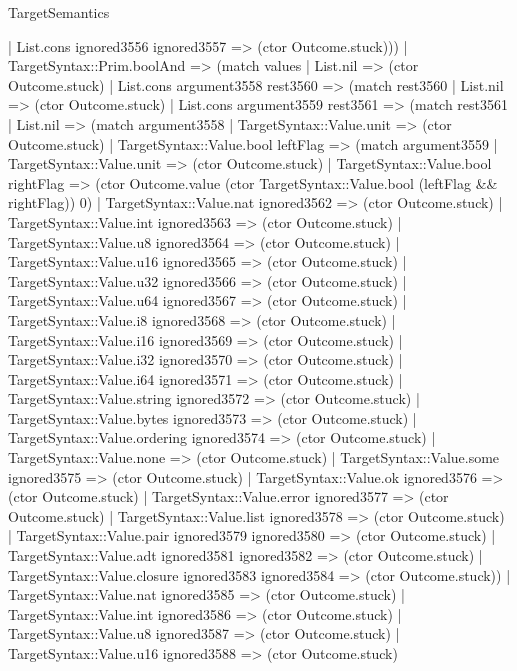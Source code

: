 \begin{lexlean}{TargetSemantics}
\begin{semanticmodule}
{        | List.cons ignored3556 ignored3557 => (ctor Outcome.stuck)))
    | TargetSyntax::Prim.boolAnd => (match values
      | List.nil => (ctor Outcome.stuck)
      | List.cons argument3558 rest3560 => (match rest3560
        | List.nil => (ctor Outcome.stuck)
        | List.cons argument3559 rest3561 => (match rest3561
          | List.nil => (match argument3558
            | TargetSyntax::Value.unit => (ctor Outcome.stuck)
            | TargetSyntax::Value.bool leftFlag => (match argument3559
              | TargetSyntax::Value.unit => (ctor Outcome.stuck)
              | TargetSyntax::Value.bool rightFlag => (ctor Outcome.value (ctor TargetSyntax::Value.bool (leftFlag && rightFlag)) 0)
              | TargetSyntax::Value.nat ignored3562 => (ctor Outcome.stuck)
              | TargetSyntax::Value.int ignored3563 => (ctor Outcome.stuck)
              | TargetSyntax::Value.u8 ignored3564 => (ctor Outcome.stuck)
              | TargetSyntax::Value.u16 ignored3565 => (ctor Outcome.stuck)
              | TargetSyntax::Value.u32 ignored3566 => (ctor Outcome.stuck)
              | TargetSyntax::Value.u64 ignored3567 => (ctor Outcome.stuck)
              | TargetSyntax::Value.i8 ignored3568 => (ctor Outcome.stuck)
              | TargetSyntax::Value.i16 ignored3569 => (ctor Outcome.stuck)
              | TargetSyntax::Value.i32 ignored3570 => (ctor Outcome.stuck)
              | TargetSyntax::Value.i64 ignored3571 => (ctor Outcome.stuck)
              | TargetSyntax::Value.string ignored3572 => (ctor Outcome.stuck)
              | TargetSyntax::Value.bytes ignored3573 => (ctor Outcome.stuck)
              | TargetSyntax::Value.ordering ignored3574 => (ctor Outcome.stuck)
              | TargetSyntax::Value.none => (ctor Outcome.stuck)
              | TargetSyntax::Value.some ignored3575 => (ctor Outcome.stuck)
              | TargetSyntax::Value.ok ignored3576 => (ctor Outcome.stuck)
              | TargetSyntax::Value.error ignored3577 => (ctor Outcome.stuck)
              | TargetSyntax::Value.list ignored3578 => (ctor Outcome.stuck)
              | TargetSyntax::Value.pair ignored3579 ignored3580 => (ctor Outcome.stuck)
              | TargetSyntax::Value.adt ignored3581 ignored3582 => (ctor Outcome.stuck)
              | TargetSyntax::Value.closure ignored3583 ignored3584 => (ctor Outcome.stuck))
            | TargetSyntax::Value.nat ignored3585 => (ctor Outcome.stuck)
            | TargetSyntax::Value.int ignored3586 => (ctor Outcome.stuck)
            | TargetSyntax::Value.u8 ignored3587 => (ctor Outcome.stuck)
            | TargetSyntax::Value.u16 ignored3588 => (ctor Outcome.stuck)
}
\end{semanticmodule}
\end{lexlean}
